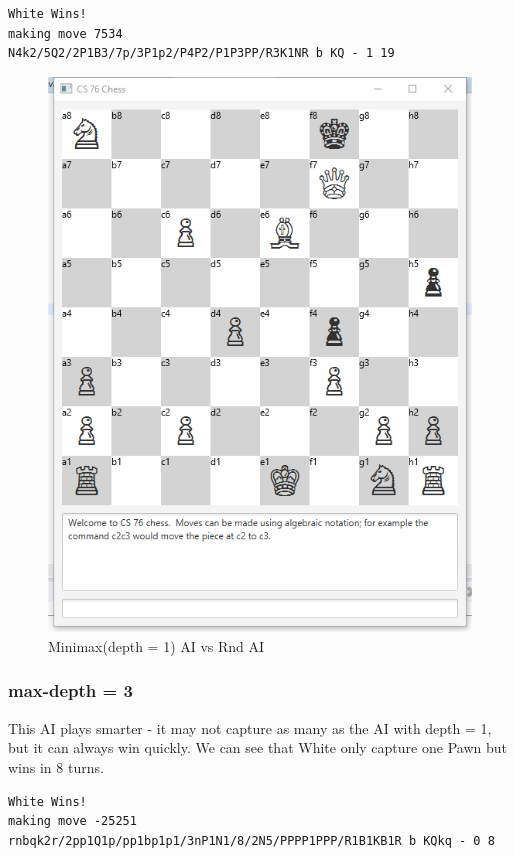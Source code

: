 \documentclass{article}
\begin{document}
\begin{lstlisting}
White Wins!
making move 7534
N4k2/5Q2/2P1B3/7p/3P1p2/P4P2/P1P3PP/R3K1NR b KQ - 1 19
\end{lstlisting}
\begin{figure}[H]
\centering
\includegraphics[width=0.7\linewidth]{max_1_rnd}
\caption{Minimax(depth = 1) AI vs Rnd AI}
\end{figure}

\clearpage
\subsubsection{max-depth = 3}
This AI plays smarter - it may not capture as many as the AI with depth = 1, but it can always win quickly. We can see that White only capture one Pawn but wins in 8 turns.
\begin{lstlisting}
White Wins!
making move -25251
rnbqk2r/2pp1Q1p/pp1bp1p1/3nP1N1/8/2N5/PPPP1PPP/R1B1KB1R b KQkq - 0 8
\end{lstlisting}
\end{document}

